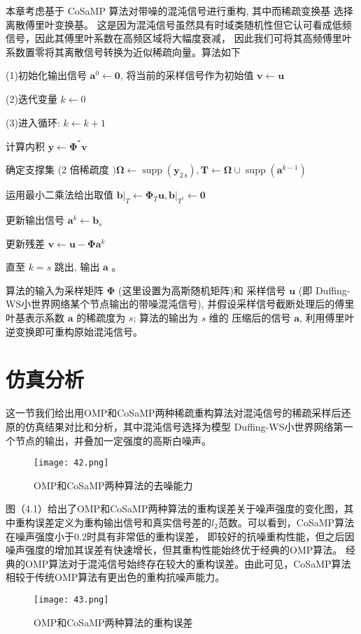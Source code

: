 本章考虑基于 CoSaMP 算法对带噪的混沌信号进行重构, 其中而稀疏变换基 选择离散傅里叶变换基。
这是因为混沌信号虽然具有时域类随机性但它认可看成低频信号，因此其傅里叶系数在高频区域将大幅度衰减，
因此我们可将其高频傅里叶系数置零将其离散信号转换为近似稀疏向量。算法如下\par
(1)初始化输出信号 $\boldsymbol{a}^0 \leftarrow \mathbf{0}$, 将当前的采样信号作为初始值 $\boldsymbol{v} \leftarrow \boldsymbol{u}$\par
(2)迭代变量 $k \leftarrow 0$\par
(3)进入循环: $k \leftarrow k+1$\par
计算内积 $\boldsymbol{y} \leftarrow \boldsymbol{\Phi}^* \boldsymbol{v}$\par
\par 确定支撑集 (2 倍稀疏度 $) \boldsymbol{\Omega} \leftarrow \operatorname{supp}\left(\mathbf{y}_{2 \mathrm{~s}}\right), \boldsymbol{T} \leftarrow \boldsymbol{\Omega} \cup \operatorname{supp}\left(\boldsymbol{a}^{k-1}\right)$
\par 运用最小二乘法给出取值 $\left.\boldsymbol{b}\right|_T \leftarrow \boldsymbol{\Phi}_T \boldsymbol{u},\left.\boldsymbol{b}\right|_{T^c} \leftarrow \mathbf{0}$
\par 更新输出信号 $\boldsymbol{a}^k \leftarrow \boldsymbol{b}_s$
\par 更新残差 $\boldsymbol{v} \leftarrow \boldsymbol{u}-\boldsymbol{\Phi} \boldsymbol{a}^k$
\par 直至 $k=s$ 跳出, 输出 $\boldsymbol{a}$ 。

算法的输入为采样矩阵 $\boldsymbol{\Phi}$ (这里设置为高斯随机矩阵)和 采样信号 $\boldsymbol{u}$
(即 Duffing-WS小世界网络某个节点输出的带噪混沌信号), 并假设采样信号截断处理后的傅里叶基表示系数 $\boldsymbol{a}$
的稀疏度为 $s$; 算法的输出为 $s$ 维的 压缩后的信号 $\boldsymbol{a}$, 利用傅里叶逆变换即可重构原始混沌信号。


\section{仿真分析}
这一节我们给出用OMP和CoSaMP两种稀疏重构算法对混沌信号的稀疏采样后还原的仿真结果对比和分析，其中混沌信号选择为模型
Duffing-WS小世界网络第一个节点的输出，并叠加一定强度的高斯白噪声。\par
\begin{figure}[!htbp]
    \centering
    \texttt{[image: 42.png]}
    \caption{OMP和CoSaMP两种算法的去噪能力}
\end{figure}
图（4.1）给出了OMP和CoSaMP两种算法的重构误差关于噪声强度的变化图，其中重构误差定义为重构输出信号和真实信号差的$l_2$范数。可以看到，CoSaMP算法在噪声强度小于0.2时具有非常低的重构误差，
即较好的抗噪重构性能，但之后因噪声强度的增加其误差有快速增长，但其重构性能始终优于经典的OMP算法。
经典的OMP算法对于混沌信号始终存在较大的重构误差。由此可见，CoSaMP算法相较于传统OMP算法有更出色的重构抗噪声能力。\par
\begin{figure}[!htbp]
    \centering
    \texttt{[image: 43.png]}
    \caption{OMP和CoSaMP两种算法的重构误差}
\end{figure}

